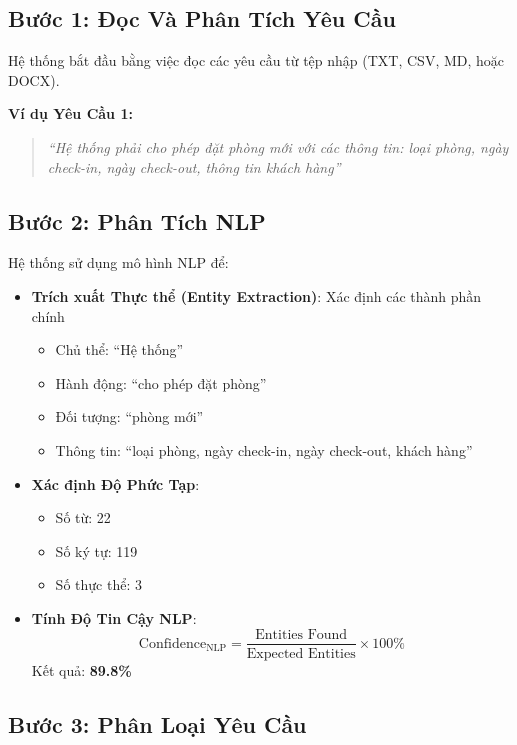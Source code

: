 \documentclass[12pt, a4paper]{article}
\begin{document}
\subsection{Bước 1: Đọc Và Phân Tích Yêu Cầu}

Hệ thống bắt đầu bằng việc đọc các yêu cầu từ tệp nhập (TXT, CSV, MD, hoặc DOCX).

\textbf{Ví dụ Yêu Cầu 1:}
\begin{quote}
\textit{``Hệ thống phải cho phép đặt phòng mới với các thông tin: loại phòng, ngày check-in, ngày check-out, thông tin khách hàng''}
\end{quote}

\subsection{Bước 2: Phân Tích NLP}

Hệ thống sử dụng mô hình NLP để:
\begin{itemize}
    \item \textbf{Trích xuất Thực thể (Entity Extraction)}: Xác định các thành phần chính
    \begin{itemize}
        \item Chủ thể: ``Hệ thống''
        \item Hành động: ``cho phép đặt phòng''
        \item Đối tượng: ``phòng mới''
        \item Thông tin: ``loại phòng, ngày check-in, ngày check-out, khách hàng''
    \end{itemize}
    
    \item \textbf{Xác định Độ Phức Tạp}: 
    \begin{itemize}
        \item Số từ: 22
        \item Số ký tự: 119
        \item Số thực thể: 3
    \end{itemize}
    
    \item \textbf{Tính Độ Tin Cậy NLP}:
    \begin{equation}
    \text{Confidence}_{\text{NLP}} = \frac{\text{Entities Found}}{\text{Expected Entities}} \times 100\%
    \end{equation}
    Kết quả: \textbf{89.8\%}
\end{itemize}

\subsection{Bước 3: Phân Loại Yêu Cầu}
\end{document}
